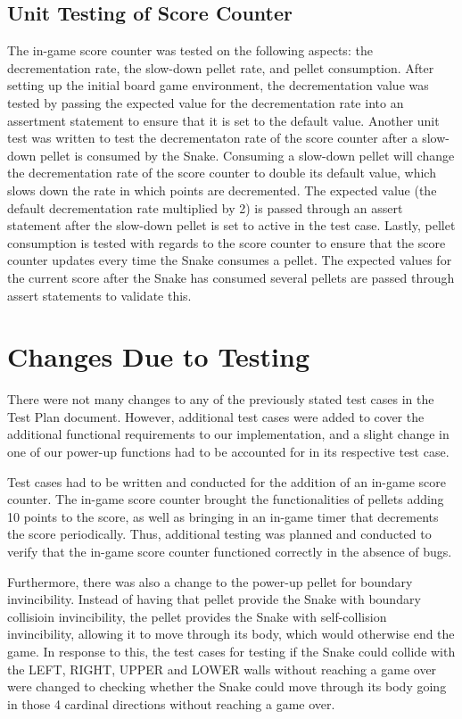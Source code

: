 \documentclass[12pt, titlepage]{article}
\begin{document}
\subsection{Unit Testing of Score Counter}
The in-game score counter was tested on the following aspects: the decrementation rate, the slow-down pellet rate, and pellet consumption. After setting up the initial board game environment, the decrementation value was tested by passing the expected value for the decrementation rate into an assertment statement to ensure that it is set to the default value. Another unit test was written to test the decrementaton rate of the score counter after a slow-down pellet is consumed by the Snake. Consuming a slow-down pellet will change the decrementation rate of the score counter to double its default value, which slows down the rate in which points are decremented. The expected value (the default decrementation rate multiplied by 2) is passed through an assert statement after the slow-down pellet is set to active in the test case. Lastly, pellet consumption is tested with regards to the score counter to ensure that the score counter updates every time the Snake consumes a pellet. The expected values for the current score after the Snake has consumed several pellets are passed through assert statements to validate this.

\section{Changes Due to Testing}
There were not many changes to any of the previously stated test cases in the Test Plan document. However, additional test cases were added to cover the additional functional requirements to our implementation, and a slight change in one of our power-up functions had to be accounted for in its respective test case. 

Test cases had to be written and conducted for the addition of an in-game score counter. The in-game score counter brought the functionalities of pellets adding 10 points to the score, as well as bringing in an in-game timer that decrements the score periodically. Thus, additional testing was planned and conducted to verify that the in-game score counter functioned correctly in the absence of bugs.

Furthermore, there was also a change to the power-up pellet for boundary invincibility. Instead of having that pellet provide the Snake with boundary collisioin invincibility, the pellet provides the Snake with self-collision invincibility, allowing it to move through its body, which would otherwise end the game. In response to this, the test cases for testing if the Snake could collide with the LEFT, RIGHT, UPPER and LOWER walls without reaching a game over were changed to checking whether the Snake could move through its body going in those 4 cardinal directions without reaching a game over.
\end{document}
